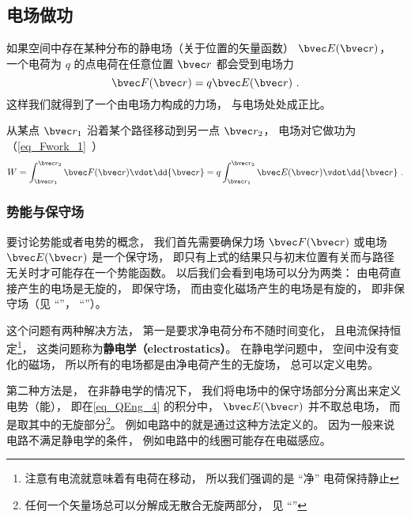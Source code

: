 

\subsection{电场做功}
如果空间中存在某种分布的静电场（关于位置的矢量函数） $\bvec E(\bvec r)$， 一个电荷为 $q$ 的点电荷在任意位置 $\bvec r$ 都会受到电场力
\begin{equation}
\bvec F(\bvec r) = q \bvec E(\bvec r)~.
\end{equation}
这样我们就得到了一个由电场力构成的力场， 与电场处处成正比。 

从某点 $\bvec r_1$ 沿着某个路径移动到另一点 $\bvec r_2$， 电场对它做功为（\autoref{eq_Fwork_1}~）
\begin{equation}\label{eq_QEng_4}
W = \int_{\bvec r_1}^{\bvec r_2} \bvec F(\bvec r) \vdot \dd{\bvec r} = q \int_{\bvec r_1}^{\bvec r_2} \bvec E(\bvec r) \vdot \dd{\bvec r}~.
\end{equation}

\subsubsection{势能与保守场}
要讨论势能或者电势的概念， 我们首先需要确保力场 $\bvec F(\bvec r)$ 或电场 $\bvec E(\bvec r)$ 是一个保守场， 即只有上式的结果只与初末位置有关而与路径无关时才可能存在一个势能函数。 以后我们会看到电场可以分为两类： 由电荷直接产生的电场是无旋的， 即保守场， 而由变化磁场产生的电场是有旋的， 即非保守场（见 “”， “”）。

这个问题有两种解决方法， 第一是要求净电荷分布不随时间变化， 且电流保持恒定\footnote{注意有电流就意味着有电荷在移动， 所以我们强调的是 “净” 电荷保持静止}， 这类问题称为\textbf{静电学（electrostatics）}。 在静电学问题中， 空间中没有变化的磁场， 所以所有的电场都是由净电荷产生的无旋场， 总可以定义电势。

第二种方法是， 在非静电学的情况下， 我们将电场中的保守场部分分离出来定义电势（能）， 即在\autoref{eq_QEng_4} 的积分中， $\bvec E(\bvec r)$ 并不取总电场， 而是取其中的无旋部分\footnote{任何一个矢量场总可以分解成无散合无旋两部分， 见 “”}。 例如电路中的就是通过这种方法定义的。 因为一般来说电路不满足静电学的条件， 例如电路中的线圈可能存在电磁感应。

